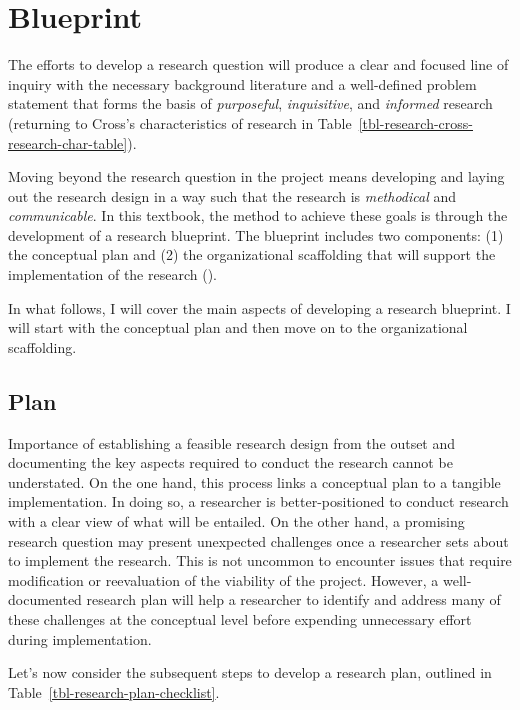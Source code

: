 \documentclass[
  letterpaper,
  krantz1]{latex/krantz-mod}
\theoremstyle{definition}
\theoremstyle{definition}
\theoremstyle{remark}
\begin{document}
\section{Blueprint}\label{sec-research-blueprint}

The efforts to develop a research question will produce a clear and
focused line of inquiry with the necessary background literature and a
well-defined problem statement that forms the basis of
\emph{purposeful}, \emph{inquisitive}, and \emph{informed} research
(returning to Cross's characteristics of research in
Table~\ref{tbl-research-cross-research-char-table}).

Moving beyond the research question in the project means developing and
laying out the research design in a way such that the research is
\emph{methodical} and \emph{communicable}. In this textbook, the method
to achieve these goals is through the development of a research
blueprint. The blueprint includes two components:
(1) the conceptual plan and (2) the organizational scaffolding that will
support the implementation of the research
().

In what follows, I will cover the main aspects of developing a research
blueprint. I will start with the conceptual plan and then move on to the
organizational scaffolding.

\subsection{Plan}\label{sec-research-plan}

Importance of establishing a feasible research design from the outset
and documenting the key aspects required to conduct the research cannot
be understated. On the one hand, this process links a conceptual plan to
a tangible implementation. In doing so, a researcher is
better-positioned to conduct research with a clear view of what will be
entailed. On the other hand, a promising research question may present
unexpected challenges once a researcher sets about to implement the
research. This is not uncommon to encounter issues that require
modification or reevaluation of the viability of the project. However, a
well-documented research plan will help a researcher to identify and
address many of these challenges at the conceptual level before
expending unnecessary effort during implementation.

Let's now consider the subsequent steps to develop a research plan,
outlined in Table~\ref{tbl-research-plan-checklist}.
\end{document}
